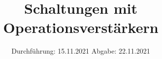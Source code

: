 
\setlength\parindent{0pt}
\subject{V51}
\title{Schaltungen mit Operationsverstärkern}
\date{%
  Durchführung: 15.11.2021
  \hspace{3em}
  Abgabe: 22.11.2021 \\
}



\maketitle
\thispagestyle{empty}
\tableofcontents
\newpage







\newpage
\nocite{*}
\printbibliography
\appendix


